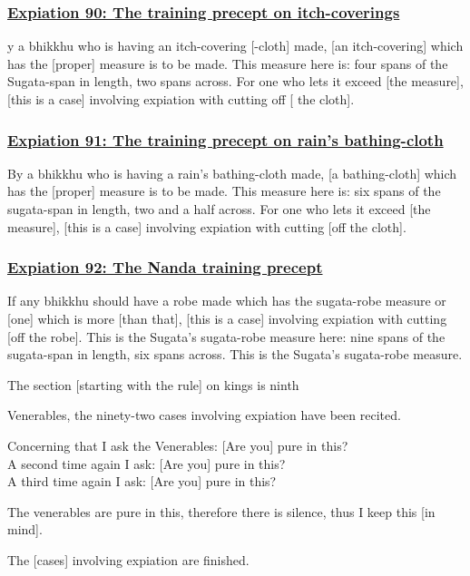 \subsubsection*{\hyperref[pac90]{Expiation 90: The training precept on itch-coverings}}
\label{exp90}
y a bhikkhu who is having an itch-covering [-cloth] made, [an itch-covering] which has the [proper] measure is to be made. This measure here is: four spans of the Sugata-span in length, two spans across. For one who lets it exceed [the measure], [this is a case] involving expiation with cutting off [ the cloth].

\subsubsection*{\hyperref[pac91]{Expiation 91: The training precept on rain's bathing-cloth}}
\label{exp91}
By a bhikkhu who is having a rain's bathing-cloth made, [a bathing-cloth] which has the [proper] measure is to be made. This measure here is: six spans of the sugata-span in length, two and a half across. For one who lets it exceed [the measure], [this is a case] involving expiation with cutting [off the cloth].

\subsubsection*{\hyperref[pac92]{Expiation 92: The Nanda training precept}}
\label{exp92}
If any bhikkhu should have a robe made which has the sugata-robe measure or [one] which is more [than that], [this is a case] involving expiation with cutting [off the robe]. This is the Sugata's sugata-robe measure here: nine spans of the sugata-span in length, six spans across. This is the Sugata's sugata-robe measure.

\begin{center}
  The section [starting with the rule] on kings is ninth
\end{center}

\medskip

\begin{center}
Venerables, the ninety-two cases involving expiation have been recited.

\smallskip

Concerning that I ask the Venerables: [Are you] pure in this?\\
A second time again I ask: [Are you] pure in this?\\
A third time again I ask: [Are you] pure in this?

\smallskip

The venerables are pure in this, therefore there is silence, thus I keep this [in mind].
\end{center}

\begin{outro}
The [cases] involving expiation are finished.
\end{outro}

\clearpage
